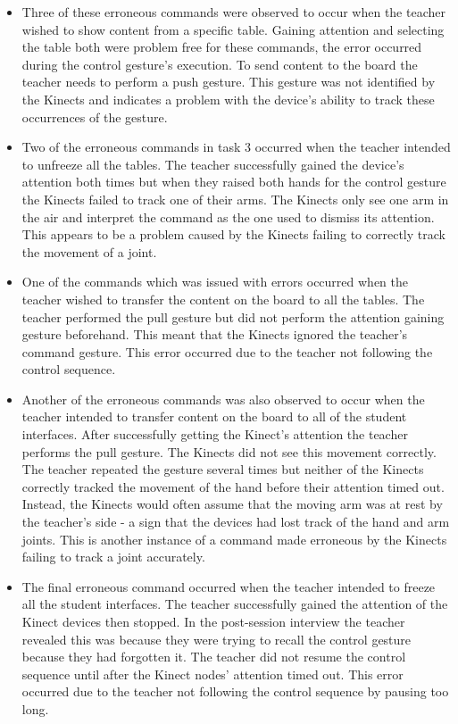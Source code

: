 \documentclass[link]{IWCOMP}
\begin{document}
\begin{itemize}
\item Three of these erroneous commands were observed to occur when the teacher wished to show content from a specific table.
Gaining attention and selecting the table both were problem free for these commands, the error occurred during the control gesture's execution.
To send content to the board the teacher needs to perform a push gesture.
This gesture was not identified by the Kinects and indicates a problem with the device's ability to track these occurrences of the gesture.

\item Two of the erroneous commands in task 3 occurred when the teacher intended to unfreeze all the tables.
The teacher successfully gained the device's attention both times but when they raised both hands for the control gesture the Kinects failed to track one of their arms.
The Kinects only see one arm in the air and interpret the command as the one used to dismiss its attention.
This appears to be a problem caused by the Kinects failing to correctly track the movement of a joint.

\item One of the commands which was issued with errors occurred when the teacher wished to transfer the content on the board to all the tables.
The teacher performed the pull gesture but did not perform the attention gaining gesture beforehand.
This meant that the Kinects ignored the teacher's command gesture.
This error occurred due to the teacher not following the control sequence.

\item Another of the erroneous commands was also observed to occur when the teacher intended to transfer content on the board to all of the student interfaces.
After successfully getting the Kinect's attention the teacher performs the pull gesture.
The Kinects did not see this movement correctly.
The teacher repeated the gesture several times but neither of the Kinects correctly tracked the movement of the hand before their attention timed out.
Instead, the Kinects would often assume that the moving arm was at rest by the teacher's side - a sign that the devices had lost track of the hand and arm joints.
This is another instance of a command made erroneous by the Kinects failing to track a joint accurately.

\item The final erroneous command occurred when the teacher intended to freeze all the student interfaces.
The teacher successfully gained the attention of the Kinect devices then stopped.
In the post-session interview the teacher revealed this was because they were trying to recall the control gesture because they had forgotten it.
The teacher did not resume the control sequence until after the Kinect nodes' attention timed out.
This error occurred due to the teacher not following the control sequence by pausing too long.
\end{itemize}
\end{document}
